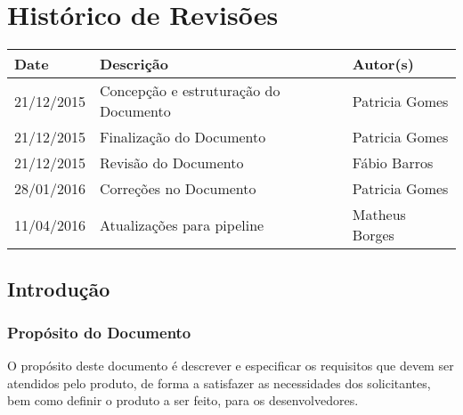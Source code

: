 \documentclass{report}
\begin{document}

\capa
\newpage
\newpage

\chapter*{Histórico de Revisões}
  \vspace*{1cm}
  \begin{table}[ht]
    \centering
    \begin{tabular}[pos]{|m{2cm} | m{6cm} | m{3cm}|} 
      \hline
      \cellcolor[gray]{0.9}\textbf{Date} & \cellcolor[gray]{0.9}\textbf{Descrição} & \cellcolor[gray]{0.9}\textbf{Autor(s)}\\
      \hline
      21/12/2015 & Concepção e estruturação do Documento & Patricia Gomes \\ \hline      
      21/12/2015 & Finalização do Documento & Patricia Gomes \\ \hline      
      21/12/2015 & Revisão do Documento & Fábio Barros \\ \hline 
      28/01/2016 & Correções no Documento & Patricia Gomes \\ \hline
      11/04/2016 & Atualizações para pipeline & Matheus Borges \\ \hline
    \end{tabular}
  \end{table}

\newpage

\tableofcontents
\newpage

\section{Introdução}
 \subsection{Propósito do Documento}
 O propósito deste documento é descrever e especificar os requisitos que devem ser  atendidos pelo produto, de forma a satisfazer as necessidades dos solicitantes, bem como definir o produto a ser feito, para os desenvolvedores.
 
\end{document}

